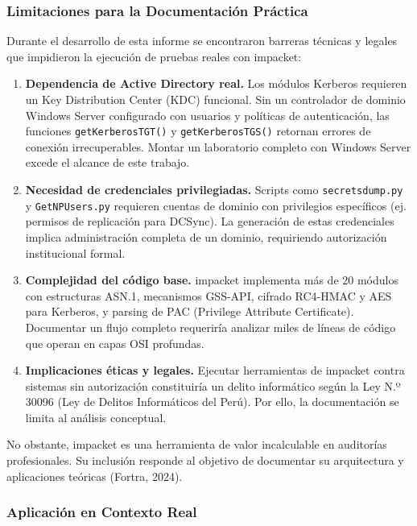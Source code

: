 \documentclass[12pt,a4paper]{article}
\begin{document}
\subsubsection{Limitaciones para la Documentación Práctica}

Durante el desarrollo de esta informe se encontraron barreras técnicas
y legales que impidieron la ejecución de pruebas reales con impacket:

\begin{enumerate}
\item \textbf{Dependencia de Active Directory real.} Los módulos Kerberos
  requieren un Key Distribution Center (KDC) funcional. Sin un
  controlador de dominio Windows Server configurado con usuarios y
  políticas de autenticación, las funciones \texttt{getKerberosTGT()} y
  \texttt{getKerberosTGS()} retornan errores de conexión irrecuperables.
  Montar un laboratorio completo con Windows Server excede el alcance de
  este trabajo.

\item \textbf{Necesidad de credenciales privilegiadas.} Scripts como
  \texttt{secretsdump.py} y \texttt{GetNPUsers.py} requieren cuentas de
  dominio con privilegios específicos (ej. permisos de replicación para
  DCSync). La generación de estas credenciales implica administración
  completa de un dominio, requiriendo autorización institucional formal.

\item \textbf{Complejidad del código base.} impacket implementa más de 20
  módulos con estructuras ASN.1, mecanismos GSS-API, cifrado RC4-HMAC y
  AES para Kerberos, y parsing de PAC (Privilege Attribute Certificate).
  Documentar un flujo completo requeriría analizar miles de líneas de
  código que operan en capas OSI profundas.

\item \textbf{Implicaciones éticas y legales.} Ejecutar herramientas de
  impacket contra sistemas sin autorización constituiría un delito
  informático según la Ley N.º 30096 (Ley de Delitos Informáticos del
  Perú). Por ello, la documentación se limita al análisis conceptual.

\end{enumerate}

No obstante, impacket es una herramienta de valor incalculable en
auditorías profesionales. Su inclusión responde al objetivo de
documentar su arquitectura y aplicaciones teóricas (Fortra, 2024).

\subsubsection{Aplicación en Contexto Real}
\end{document}
